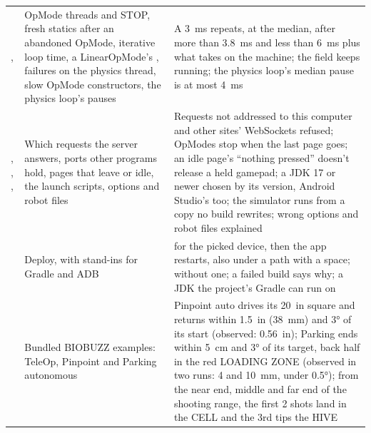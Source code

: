 \documentclass[10pt,twocolumn,letterpaper]{article}
\begin{document}
\begin{table}[tp]
\begin{tabularx}{\textwidth}{@{}>{\raggedright\arraybackslash}p{4.0cm}>{\raggedright\arraybackslash}p{5.2cm}L@{}}
,  & OpMode threads and STOP, fresh statics after an abandoned OpMode, iterative loop time, a LinearOpMode's , failures on the physics thread, slow OpMode constructors, the physics loop's pauses & A 3~ms  repeats, at the median, after more than 3.8~ms and less than 6~ms plus what  takes on the machine; the field keeps running; the physics loop's median pause is at most 4~ms \\
, , ,  & Which requests the server answers, ports other programs hold, pages that leave or idle, the launch scripts, options and robot files & Requests not addressed to this computer and other sites' WebSockets refused; OpModes stop when the last page goes; an idle page's ``nothing pressed'' doesn't release a held gamepad; a JDK 17 or newer chosen by its version, Android Studio's too; the simulator runs from a copy no build rewrites; wrong options and robot files explained \\
 & Deploy, with stand-ins for Gradle and ADB &  for the picked device, then the app restarts, also under a path with a space;  without one; a failed build says why; a JDK the project's Gradle can run on \\
 & Bundled BIOBUZZ examples: TeleOp, Pinpoint and Parking autonomous & Pinpoint auto drives its 20~in square and returns within 1.5~in (38~mm) and 3° of its start (observed: 0.56~in); Parking ends within 5~cm and 3° of its target, back half in the red LOADING ZONE (observed in two runs: 4 and 10~mm, under 0.5°); from the near end, middle and far end of the shooting range, the first 2 shots land in the CELL and the 3rd tips the HIVE \\
\bottomrule
\end{tabularx}
\end{table}
\end{document}
